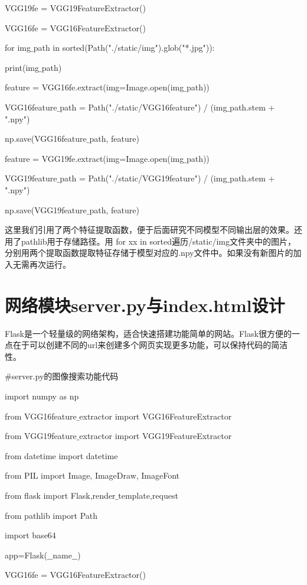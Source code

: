 \documentclass[bachelor_p]{hdu-thesis}
\begin{document}
\qquad VGG19fe = VGG19FeatureExtractor()

\qquad VGG16fe = VGG16FeatureExtractor()
    
\qquad for img$\_$path in sorted(Path("./static/img").glob("*.jpg")):

\qquad \qquad print(img$\_$path)

\qquad \qquad feature = VGG16fe.extract(img=Image.open(img$\_$path))

\qquad \qquad VGG16feature$\_$path = Path("./static/VGG16feature") / (img$\_$path.stem + ".npy") 

\qquad \qquad np.save(VGG16feature$\_$path, feature)

\qquad \qquad feature = VGG19fe.extract(img=Image.open(img$\_$path))

\qquad \qquad VGG19feature$\_$path = Path("./static/VGG19feature") / (img$\_$path.stem + ".npy")  

\qquad \qquad np.save(VGG19feature$\_$path, feature)

这里我们引用了两个特征提取函数，便于后面研究不同模型不同输出层的效果。还用了pathlib用于存储路径。用 for xx in sorted遍历/static/img文件夹中的图片，分别用两个提取函数提取特征存储于模型对应的.npy文件中。如果没有新图片的加入无需再次运行。

\section {网络模块server.py与index.html设计}

Flask是一个轻量级的网络架构，适合快速搭建功能简单的网站。Flask很方便的一点在于可以创建不同的url来创建多个网页实现更多功能，可以保持代码的简洁性。

$\#$server.py的图像搜索功能代码

import numpy as np

from VGG16feature$\_$extractor import VGG16FeatureExtractor

from VGG19feature$\_$extractor import VGG19FeatureExtractor

from datetime import datetime

from PIL import Image, ImageDraw, ImageFont

from flask import Flask,render$\_$template,request

from pathlib import Path

import base64

app=Flask($\_$$\_$name$\_$$\_$)

VGG16fe = VGG16FeatureExtractor()
\end{document}
